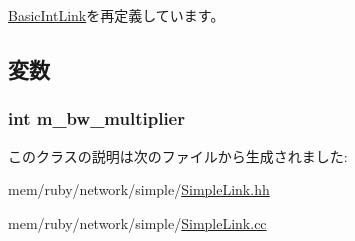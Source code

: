\hyperlink{classBasicIntLink_acd2b8699ab7559c0da687cd775e2c778}{BasicIntLink}を再定義しています。

\subsection{変数}
\hypertarget{classSimpleIntLink_a543e68bab5d8c6ed00c96039e2ef62fd}{
\subsubsection[{m\_\-bw\_\-multiplier}]{\setlength{\rightskip}{0pt plus 5cm}int {\bf m\_\-bw\_\-multiplier}}}
\label{classSimpleIntLink_a543e68bab5d8c6ed00c96039e2ef62fd}


このクラスの説明は次のファイルから生成されました:\begin{DoxyCompactItemize}
\item 
mem/ruby/network/simple/\hyperlink{SimpleLink_8hh}{SimpleLink.hh}\item 
mem/ruby/network/simple/\hyperlink{SimpleLink_8cc}{SimpleLink.cc}\end{DoxyCompactItemize}
